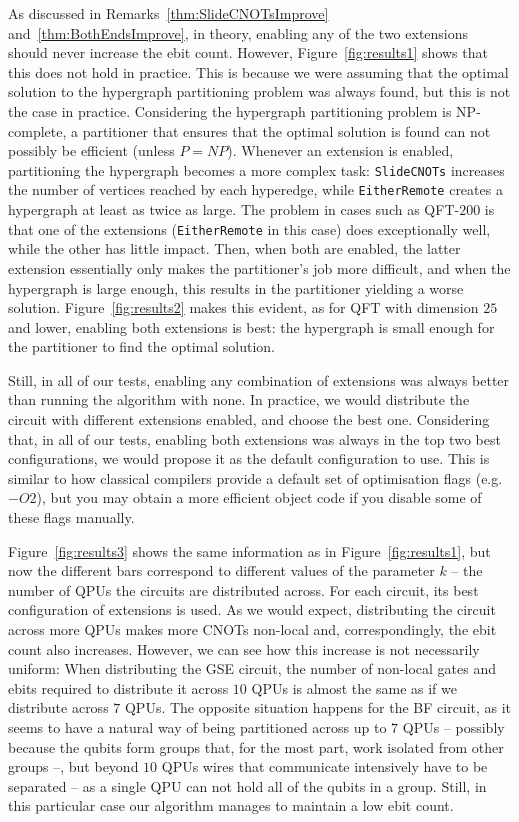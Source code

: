 As discussed in Remarks~\ref{thm:SlideCNOTsImprove} and~\ref{thm:BothEndsImprove}, in theory, enabling any of the two extensions should never increase the ebit count. However, Figure~\ref{fig:results1} shows that this does not hold in practice. This is because we were assuming that the optimal solution to the hypergraph partitioning problem was always found, but this is not the case in practice. Considering the hypergraph partitioning problem is NP-complete, a partitioner that ensures that the optimal solution is found can not possibly be efficient (unless \(P=NP\)). Whenever an extension is enabled, partitioning the hypergraph becomes a more complex task: \texttt{SlideCNOTs} increases the number of vertices reached by each hyperedge, while \texttt{EitherRemote} creates a hypergraph at least as twice as large. The problem in cases such as QFT-\(200\) is that one of the extensions (\texttt{EitherRemote} in this case) does exceptionally well, while the other has little impact. Then, when both are enabled, the latter extension essentially only makes the partitioner's job more difficult, and when the hypergraph is large enough, this results in the partitioner yielding a worse solution. Figure~\ref{fig:results2} makes this evident, as for QFT with dimension \(25\) and lower, enabling both extensions is best: the hypergraph is small enough for the partitioner to find the optimal solution. 



Still, in all of our tests, enabling any combination of extensions was always better than running the algorithm with none. In practice, we would distribute the circuit with different extensions enabled, and choose the best one. Considering that, in all of our tests, enabling both extensions was always in the top two best configurations, we would propose it as the default configuration to use. This is similar to how classical compilers provide a default set of optimisation flags (e.g.\ \(-O2\)), but you may obtain a more efficient object code if you disable some of these flags manually.



Figure~\ref{fig:results3} shows the same information as in Figure~\ref{fig:results1}, but now the different bars correspond to different values of the parameter \(k\) -- the number of QPUs the circuits are distributed across. For each circuit, its best configuration of extensions is used. As we would expect, distributing the circuit across more QPUs makes more CNOTs non-local and, correspondingly, the ebit count also increases. However, we can see how this increase is not necessarily uniform: When distributing the GSE circuit, the number of non-local gates and ebits required to distribute it across \(10\) QPUs is almost the same as if we distribute across \(7\) QPUs. The opposite situation happens for the BF circuit, as it seems to have a natural way of being partitioned across up to \(7\) QPUs -- possibly because the qubits form groups that, for the most part, work isolated from other groups --, but beyond \(10\) QPUs wires that communicate intensively have to be separated -- as a single QPU can not hold all of the qubits in a group. Still, in this particular case our algorithm manages to maintain a low ebit count. 

